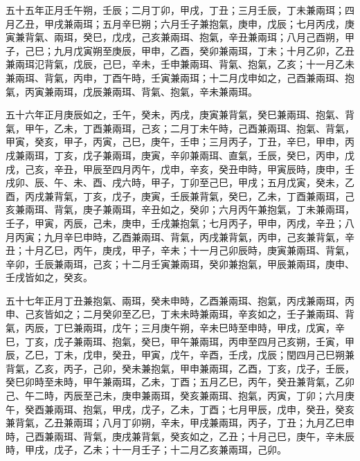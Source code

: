 \begin{pinyinscope}
五十五年正月壬午朔，壬辰；二月丁卯，甲戌，丁丑；三月壬辰，丁未兼兩珥；四月乙丑，甲戌兼兩珥；五月辛巳朔；六月壬子兼抱氣，庚申，戊辰；七月丙戌，庚寅兼背氣、兩珥，癸巳，戊戌，己亥兼兩珥、抱氣，辛丑兼兩珥；八月己酉朔，甲子，己巳；九月戊寅朔至庚辰，甲申，乙酉，癸卯兼兩珥，丁未；十月乙卯，乙丑兼兩珥氾背氣，戊辰，己巳，辛未，壬申兼兩珥、背氣、抱氣，乙亥；十一月乙未兼兩珥、背氣，丙申，丁酉午時，壬寅兼兩珥；十二月戊申如之，己酉兼兩珥、抱氣，丙寅兼兩珥，戊辰兼兩珥、背氣、抱氣，辛未兼兩珥。

五十六年正月庚辰如之，壬午，癸未，丙戌，庚寅兼背氣，癸巳兼兩珥、抱氣、背氣，甲午，乙未，丁酉兼兩珥，己亥；二月丁未午時，己酉兼兩珥、抱氣、背氣，甲寅，癸亥，甲子，丙寅，己巳，庚午，壬申；三月丙子，丁丑，辛巳，甲申，丙戌兼兩珥，丁亥，戊子兼兩珥，庚寅，辛卯兼兩珥、直氣，壬辰，癸巳，丙申，戊戌，己亥，辛丑，甲辰至四月丙午，戊申，辛亥，癸丑申時，甲寅辰時，庚申，壬戌卯、辰、午、未、酉、戌六時，甲子，丁卯至己巳，甲戌；五月戊寅，癸未，乙酉，丙戌兼背氣，丁亥，戊子，庚寅，壬辰兼背氣，癸巳，乙未，丁酉兼兩珥，己亥兼兩珥、背氣，庚子兼兩珥，辛丑如之，癸卯；六月丙午兼抱氣，丁未兼兩珥，壬子，甲寅，丙辰，己未，庚申，壬戌兼抱氣；七月丙子，甲申，丙戌，辛丑；八月丙寅；九月辛巳申時，乙酉兼兩珥、背氣，丙戌兼背氣，丙申，己亥兼背氣，辛丑；十月乙巳，丙午，庚戌，甲子，辛未；十一月己卯辰時，庚寅兼兩珥、背氣，辛卯，壬辰兼兩珥，己亥；十二月壬寅兼兩珥，癸卯兼抱氣，甲辰兼兩珥，庚申、壬戌皆如之，癸亥。

五十七年正月丁丑兼抱氣、兩珥，癸未申時，乙酉兼兩珥、抱氣，丙戌兼兩珥，丙申、己亥皆如之；二月癸卯至乙巳，丁未未時兼兩珥，辛亥如之，壬子兼兩珥、背氣，丙辰，丁巳兼兩珥，戊午；三月庚午朔，辛未巳時至申時，甲戌，戊寅，辛巳，丁亥，戊子兼兩珥、抱氣，癸巳，甲午兼兩珥，丙申至四月己亥朔，壬寅，甲辰，乙巳，丁未，戊申，癸丑，甲寅，戊午，辛酉，壬戌，戊辰；閏四月己巳朔兼背氣，乙亥，丙子，己卯，癸未兼抱氣，甲申兼兩珥，乙酉，丁亥，戊子，壬辰，癸巳卯時至未時，甲午兼兩珥，乙未，丁酉；五月乙巳，丙午，癸丑兼背氣，乙卯己、午二時，丙辰至己未，庚申兼兩珥，癸亥兼兩珥、抱氣，丙寅，丁卯；六月庚午，癸酉兼兩珥、抱氣，甲戌，戊子，乙未，丁酉；七月甲辰，戊申，癸丑，癸亥兼背氣，乙丑兼兩珥；八月丁卯朔，辛未，甲戌兼兩珥，丙子，丁丑；九月乙巳申時，己酉兼兩珥、背氣，庚戌兼背氣，癸亥如之，乙丑；十月己巳，庚午，辛未辰時，甲戌，戊子，乙未；十一月壬子；十二月乙亥兼兩珥，己卯。


\end{pinyinscope}

